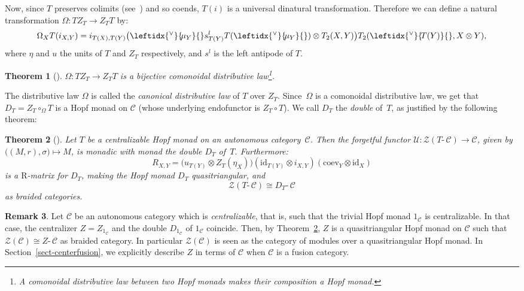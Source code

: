 \documentclass[a4paper]{amsart}
\newtheorem{thm}{Theorem}[section]
\theoremstyle{definition}
\newtheorem{rem}[thm]{Remark}
\newcommand{\co}{\colon}
\newcommand{\id}{\mathrm{id}}
\newcommand{\cc}{\mathcal{C}}
\newcommand{\uu}{\mathcal{U}}
\newcommand{\zz}{\mathcal{Z}}
\newcommand{\Rt}{$\mathrm{R}$\nobreakdash-\hspace{0pt}}
\newcommand{\ti}{\mbox{-}\,}
\newcommand{\lcoev}{\mathrm{coev}}
\newcommand{\ldual}[1]{\leftidx{^\vee}{\!#1}{}}
\begin{document}
Now, since $T$ preserves colimits (see~\cite[Remark 3.13]{BV2}) and so coends, $T(i)$ is a universal dinatural
transformation. Therefore we can define a natural transformation $\Omega\co TZ_T \to Z_TT$ by:
\begin{equation*}
\Omega_X T(i_{X,Y})= i_{T(X),T(Y)}\bigl(\ldual{\mu_Y}s^l_{T(Y)}T(\ldual{\mu_Y}) \otimes T_2(X,Y)\bigr)T_2(\ldual{T(Y)},X
\otimes Y),
\end{equation*}
where $\eta$ and $u$ the units of $T$ and $Z_T$ respectively, and $s^l$ is the left antipode of $T$.

\begin{thm}[\cite{BV3}]\label{thm-candistlaw}
$\Omega\co TZ_T \to Z_TT$ is a bijective comonoidal distributive law\footnote{A comonoidal distributive law between two Hopf
monads makes their composition a Hopf monad.}.
\end{thm}

The distributive law $\Omega$ is called the \emph{canonical distributive law} of $T$ over $Z_T$. Since~$\Omega$ is a
comonoidal distributive law, we get that $D_T=Z_T \circ_{\Omega} T$ is a Hopf monad on $\cc$ (whose underlying endofunctor
is $Z_T\circ T$). We call $D_T$ the \emph{double} of~$T$, as justified by the following theorem:

\begin{thm}[\cite{BV3}]\label{thm-doublable}
Let $T$ be a centralizable Hopf monad on an autonomous category~$\cc$. Then the forgetful functor $\uu\co \zz(T\ti\cc) \to
\cc$, given by $\bigl ((M,r),\sigma\bigr ) \mapsto M$, is monadic with monad the double $D_T$ of~$T$. Furthermore:
\begin{equation*}
R_{X,Y}=( u_{T(Y)} \otimes Z_T(\eta_X)\bigr)(\id_{T(Y)} \otimes i_{X,Y})(\lcoev_{Y} \otimes \id_X)
\end{equation*}
is a \Rt matrix for $D_T$, making the Hopf monad $D_T$ quasitriangular, and
\begin{equation*}
\zz(T\ti\cc) \cong D_T \ti \cc
\end{equation*}
as braided categories.
\end{thm}

\begin{rem}
Let $\cc$ be an autonomous category which is \emph{centralizable}, that is, such that the trivial Hopf monad $1_\cc$ is
centralizable. In that case, the centralizer $Z=Z_{1_\cc}$ and the double $D_{1_\cc}$ of $1_\cc$ coincide. Then, by
Theorem~\ref{thm-doublable}, $Z$ is a quasitriangular Hopf monad on $\cc$ such that $\zz(\cc) \cong Z \ti \cc$ as braided
category. In particular $\zz(\cc)$ is seen as the category of modules over a quasitriangular Hopf monad. In
Section~\ref{sect-centerfusion}, we explicitly describe $Z$ in terms of $\cc$ when $\cc$ is a fusion category.
\end{rem}
\end{document}
